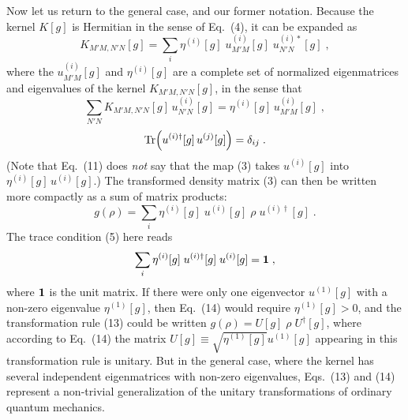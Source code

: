 \documentclass[12pt]{article}
\def\BM#1{\mbox{\boldmath{$#1$}}}
\begin{document}
Now let us return to the general case, and our former notation.  Because the kernel $K[g]$ is Hermitian in the sense of Eq.~(4), it can be expanded as
\begin{equation}
K_{M'M,N'N}[g]=\sum_i \eta^{(i)}[g]\;u^{(i)}_{M'M}[g]\;u^{(i)*}_{N'N}[g]\;,
\end{equation}
where the $u^{(i)}_{M'M}[g]$ and $\eta^{(i)}[g]$ are a complete set of normalized eigenmatrices and eigenvalues of the kernel $K_{M'M,N'N}[g]$, in the sense that
\begin{equation}
\sum_{N'N}K_{M'M,N'N}[g]\,u^{(i)}_{N'N}[g]=\eta^{(i)}[g]\,u^{(i)}_{M'M}[g]\;,
\end{equation}
\begin{equation}
{\rm Tr}\Big(u^{(i)\dagger}[g]\,u^{(j)}[g]\Big)=\delta_{ij}\;.
\end{equation}
(Note that Eq.~(11) does {\em not} say that the map (3)  takes $u^{(i)}[g]$ into  $\eta^{(i)}[g]\,u^{(i)}[g]$.)
The transformed density matrix (3) can then be written more compactly as a sum of  matrix products:
\begin{equation}
g(\rho)=\sum_i \eta^{(i)}[g]\;u^{(i)}[g]\;\rho\;u^{(i)\dagger}[g]\;.
\end{equation}
The  trace condition (5) here reads
\begin{equation}
\sum_i \eta^{(i)}[g]\;u^{(i)\dagger}[g]\;u^{(i)}[g]=\BM{1}\;,
\end{equation}
where $\BM{1}$ is the unit matrix.
If there were only one eigenvector $u^{(1)}[g]$ with a non-zero eigenvalue $\eta^{(1)}[g]$, then Eq.~(14) would require $\eta^{(1)}[g]>0$, and the transformation rule (13) could be written $g(\rho)=U[g]\;\rho\;U^{\dagger}[g]$, where according to Eq.~(14) the matrix $U[g]\equiv \sqrt{\eta^{(1)}[g]}u^{(1)}[g]$ appearing in this transformation rule  is unitary.    But in the general case, where the kernel has  several independent eigenmatrices with non-zero eigenvalues,  Eqs.~(13) and (14)  represent  a non-trivial generalization of the unitary transformations of ordinary quantum mechanics.
\end{document}
